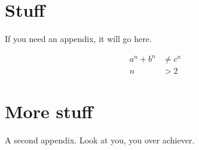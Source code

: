 \documentclass[letterpaper,11pt]{yalephd}
\begin{document}





\appendix

\chapter{Stuff}
If you need an appendix, it will go here.

\begin{align}
a^n + b^n &\ne c^n \\
n &> 2
\end{align}

\chapter{More stuff}
A second appendix. Look at you, you over achiever.

\backmatter


\end{document}
